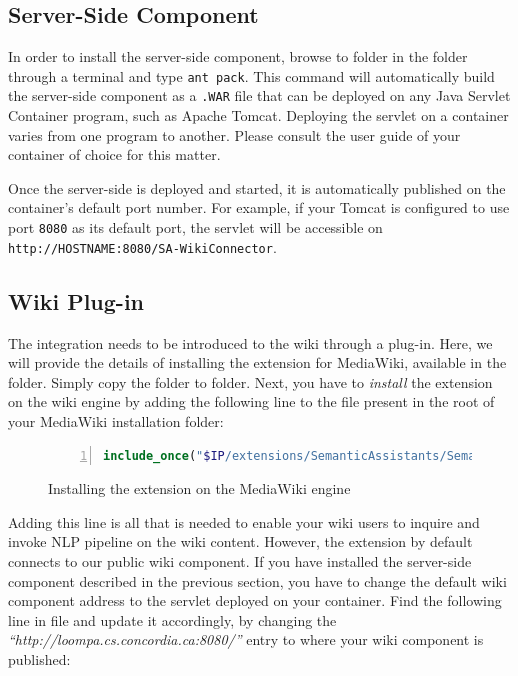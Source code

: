 \subsection{Server-Side Component}
\label{sec:wiki_component}
In order to install the server-side component, browse to  folder in the \sa folder through a terminal and type \texttt{ant pack}. This command will automatically build the server-side component as a \texttt{.WAR} file that can be deployed on any Java Servlet Container program, such as Apache Tomcat. Deploying the servlet on a container varies from one program to another. Please consult the user guide of your container of choice for this matter.

Once the server-side is deployed and started, it is automatically published on the container's default port number. For example, if your Tomcat is configured to use port \texttt{8080} as its default port, the servlet will be accessible on \texttt{http://HOSTNAME:8080/SA-WikiConnector}.

\subsection{Wiki Plug-in}
The \wikinlp integration needs to be introduced to the wiki through a plug-in. Here, we will provide the details of installing the \sa extension for MediaWiki, available in the  folder. Simply copy the \texttt{\sa} folder to  folder. Next, you have to \emph{install} the extension on the wiki engine by adding the following line to the  file present in the root of your MediaWiki installation folder:

\begin{figure}[h!]
\centering
\begin{lstlisting}[language=PHP,numbers=left,xleftmargin=4mm,columns=flexible]
include_once("$IP/extensions/SemanticAssistants/SemanticAssistants.php");
\end{lstlisting}
\caption{Installing the \sa extension on the MediaWiki engine}
\label{list:mediawiki_sa_extension_install}
\end{figure}

Adding this line is all that is needed to enable your wiki users to inquire and invoke NLP pipeline on the wiki content. However, the extension by default connects to our public \sa wiki component. If you have installed the server-side component described in the previous section, you have to change the default wiki component address to the servlet deployed on your container. Find the following line in  file and update it accordingly, by changing the \emph{``http://loompa.cs.concordia.ca:8080/''} entry to where your wiki component is published:

